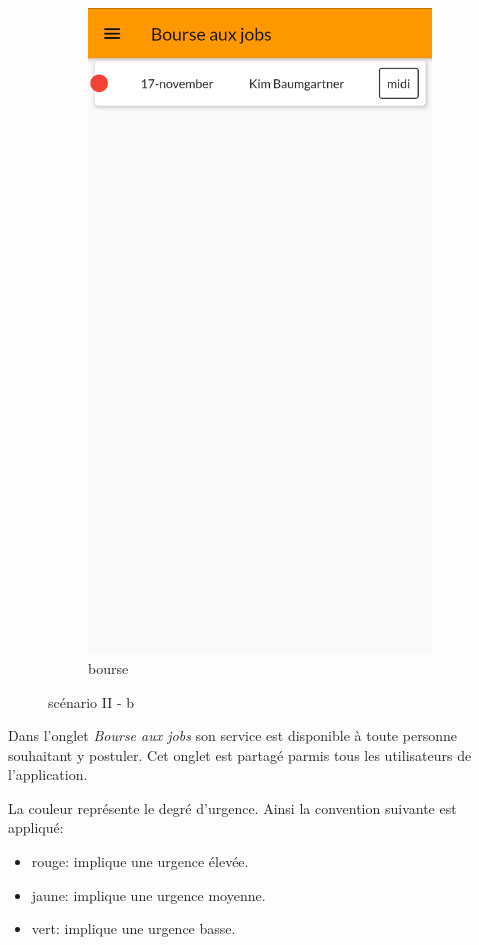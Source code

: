 \begin{figure}[!h]
\begin{subfigure}{.3\textwidth}
        \includegraphics[width=0.9\linewidth]{screenshots/scenario_02/bourse_jobs.png}
        \caption{bourse}
        \label{fig:bourse}
    \end{subfigure}
    \caption{scénario II - b}
    \label{fig:scen02b}
\end{figure}

Dans l'onglet \textit{Bourse aux jobs} son service est disponible à toute personne souhaitant y postuler. 
Cet onglet est partagé parmis tous les utilisateurs de l'application.

La couleur représente le degré d'urgence. Ainsi la convention suivante est appliqué:
\begin{itemize}
    \item rouge: implique une urgence élevée.
    \item jaune: implique une urgence moyenne.
    \item vert: implique une urgence basse.
\end{itemize}

